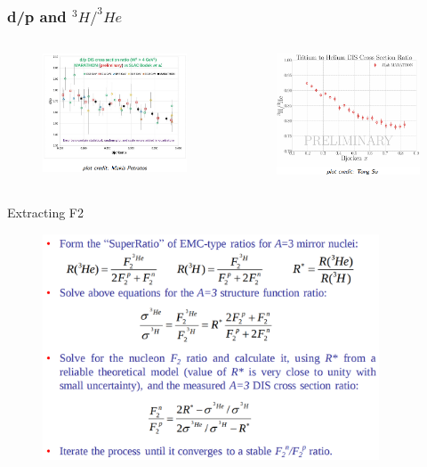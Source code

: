 \documentclass{beamer}
\begin{document}
\begin{frame}{}
\frametitle{d/p and $^3H/^3He$}
\vspace{-10pt}
\begin{columns}
	\begin{figure}
		\includegraphics[width=6cm]{../images/d_p_makis.png}
	\end{figure}
	\begin{figure}
		\includegraphics[width=6cm]{../images/H_H.png}
	\end{figure}
\end{columns}
\end{frame}

\begin{frame}{Extracting F2}

\begin{figure}
	\includegraphics[width=10cm]{../images/f2ext.png}
\end{figure}
\end{frame}
\end{document}
